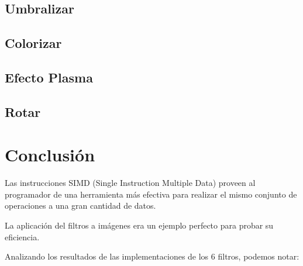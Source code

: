 \documentclass[a4paper,10pt,twoside]{article}
\begin{document}


\subsection{Umbralizar}



\subsection{Colorizar}



\subsection{Efecto Plasma}



\subsection{Rotar}







\section{Conclusión}

Las instrucciones SIMD (Single Instruction Multiple Data) proveen al programador de una herramienta más efectiva para realizar el mismo conjunto de operaciones a una gran cantidad de datos.

La aplicación del filtros a imágenes era un ejemplo perfecto para probar su eficiencia.

Analizando los resultados de las implementaciones de los 6 filtros, podemos notar:
\end{document}
